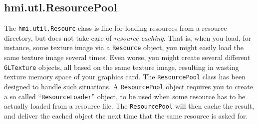 \subsection{hmi.utl.ResourcePool}

The \verb#hmi.util.Resourc# class is fine for loading resources from a resource directory, but does not take care
of \emph{ resource caching}. That is, when you load, for instance, some  texture image via a \verb#Resource# object, 
you might easily load the same texture image several times. 
Even worse, you might create several different  \verb#GLTexture# objects, all based on the same texture image, resulting in
wasting texture memory space of your graphics card. The \verb#ResourcePool# class has been designed to handle such situations.
A \verb#ResourcePool# object requires you to create a so called ``\verb#ResourceLoader#'' object, to be used when some resource has to be actually loaded from a resource file. The \verb#ResourcePool# will then cache the result, and deliver the cached object
the next time that the same resource is asked for. 





